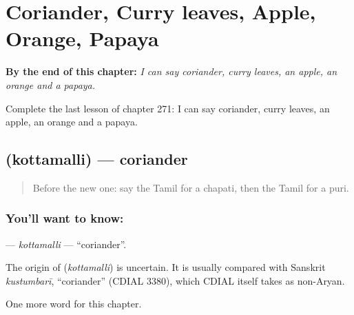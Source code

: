 
\chapter{Coriander, Curry leaves, Apple, Orange, Papaya}
\label{ch:ta-coriander-curry-leaves-apple-orange-papaya}

\begin{chapteropening}
\textbf{By the end of this chapter:} \emph{I can say coriander, curry leaves, an apple, an orange and a papaya.}

Complete the last lesson of chapter 271: I can say coriander, curry leaves, an apple, an orange and a papaya.
\end{chapteropening}

\section[\texorpdfstring{\ta{கொத்தமல்லி} (kottamalli)}{கொத்தமல்லி (kottamalli)}]{ (kottamalli) — coriander}

\label{lesson:TA-C271-kottamalli}



\begin{quote}
Before the new one: say the Tamil for a chapati, then the Tamil for a puri.
\end{quote}

\subsection*{You'll want to know: }
\textbf{} — \emph{kottamalli} — \textquotedblleft{}coriander\textquotedblright{}.

\begin{cousinweb}
The origin of \textbf{} (\emph{kottamalli}) is uncertain. It is usually compared with Sanskrit \emph{kustumbarī}, \textquotedblleft{}coriander\textquotedblright{} (CDIAL 3380), which CDIAL itself takes as non-Aryan.
\end{cousinweb}

\begin{grammarlens}[title={What you've built}]
One more word for this chapter.
\end{grammarlens}

